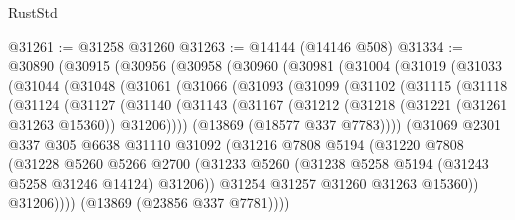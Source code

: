 \begin{lexlean}{RustStd}
\begin{coremodule}
@31261 := @31258 @31260
@31263 := @14144 (@14146 @508)
@31334 := @30890
    (@30915
      (@30956
        (@30958
          (@30960
            (@30981
              (@31004
                (@31019
                  (@31033
                    (@31044
                      (@31048
                        (@31061
                          (@31066
                            (@31093
                              (@31099
                                (@31102
                                  (@31115
                                    (@31118
                                      (@31124
                                        (@31127
                                          (@31140
                                            (@31143
                                              (@31167
                                                (@31212
                                                  (@31218 (@31221 (@31261 @31263 @15360)) @31206))))
                                            (@13869 (@18577 @337 @7783))))
                                        (@31069
                                          @2301
                                          @337
                                          @305
                                          @6638
                                          @31110
                                          @31092
                                          (@31216
                                            @7808
                                            @5194
                                            (@31220
                                              @7808
                                              (@31228
                                                @5260
                                                @5266
                                                @2700
                                                (@31233
                                                  @5260
                                                  (@31238
                                                    @5258
                                                    @5194
                                                    (@31243 @5258 @31246 @14124)
                                                    @31206))
                                                @31254
                                                @31257
                                                @31260
                                                @31263
                                                @15360))
                                            @31206))))
                                    (@13869 (@23856 @337 @7781))))

\end{coremodule}
\end{lexlean}
